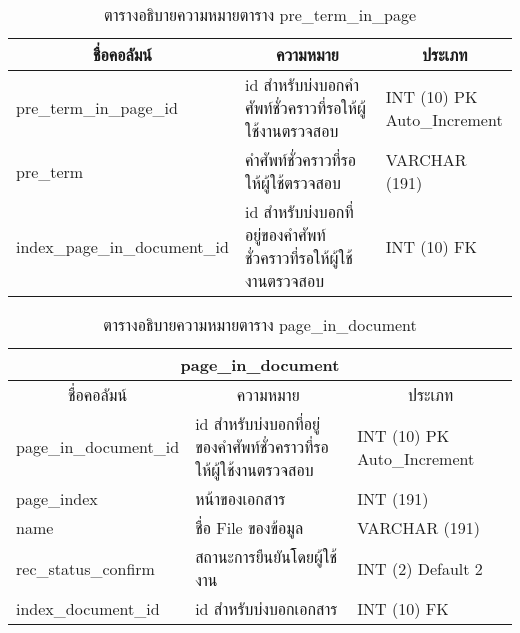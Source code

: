 \begin{table}[H]
\caption{ตารางอธิบายความหมายตาราง pre\_term\_in\_page}\label{tbl:preterminpage}        
\begin{tabular}{|l|l|l|}
\hline
\multicolumn{1}{|c|}{ชื่อคอลัมน์} & \multicolumn{1}{c|}{ความหมาย}                                      & \multicolumn{1}{c|}{ประเภท}                                                   \\ \hline
pre\_term\_in\_page\_id           & id   สำหรับบ่งบอกคำศัพท์ชั่วคราวที่รอให้ผู้ใช้งานตรวจสอบ           & \makecell[l]{INT   (10) PK\\Auto\_Increment} \\ \hline
pre\_term                         & คำศัพท์ชั่วคราวที่รอให้ผู้ใช้ตรวจสอบ                               & VARCHAR   (191)                                                               \\ \hline
index\_page\_in\_document\_id     & id   สำหรับบ่งบอกที่อยู่ของคำศัพท์ชั่วคราวที่รอให้ผู้ใช้งานตรวจสอบ & INT (10) FK                                                                   \\ \hline
\end{tabular}
\end{table}

\begin{table}[H]
\caption{ตารางอธิบายความหมายตาราง page\_in\_document}\label{tbl:pageindocument}        
\begin{tabular}{|l|l|l|}
\hline
\multicolumn{3}{|c|}{page\_in\_document}                                                                                             \\ \hline
\multicolumn{1}{|c|}{ชื่อคอลัมน์} & \multicolumn{1}{c|}{ความหมาย}                                    & \multicolumn{1}{c|}{ประเภท}   \\ \hline
page\_in\_document\_id            & id สำหรับบ่งบอกที่อยู่ของคำศัพท์ชั่วคราวที่รอให้ผู้ใช้งานตรวจสอบ & INT   (10) PK Auto\_Increment \\ \hline
page\_index                       & หน้าของเอกสาร                                                    & INT (191)                     \\ \hline
name                              & ชื่อ File ของข้อมูล                                              & VARCHAR (191)                 \\ \hline
rec\_status\_confirm              & สถานะการยืนยันโดยผู้ใช้งาน                                       & INT   (2) Default 2           \\ \hline
index\_document\_id               & id สำหรับบ่งบอกเอกสาร                                            & INT (10) FK                   \\ \hline
\end{tabular}
\end{table}

